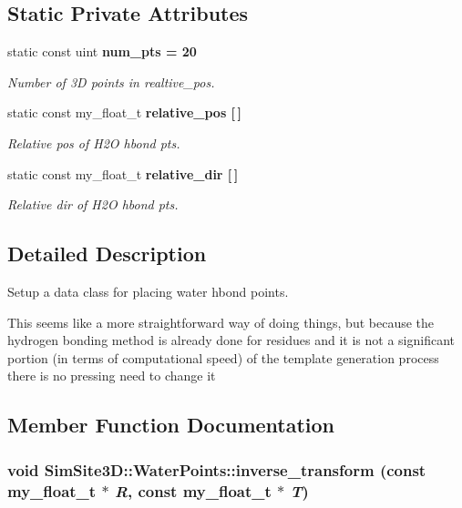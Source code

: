 \subsection*{Static Private Attributes}
\begin{CompactItemize}
\item 
static const uint \bf{num\_\-pts} = 20\label{classSimSite3D_1_1WaterPoints_a96d16672c2be18eb651e9594045a30d}

\begin{CompactList}\small\item\em Number of 3D points in realtive\_\-pos. \item\end{CompactList}\item 
static const my\_\-float\_\-t \bf{relative\_\-pos} [$\,$]
\begin{CompactList}\small\item\em Relative pos of H2O hbond pts. \item\end{CompactList}\item 
static const my\_\-float\_\-t \bf{relative\_\-dir} [$\,$]
\begin{CompactList}\small\item\em Relative dir of H2O hbond pts. \item\end{CompactList}\end{CompactItemize}


\subsection{Detailed Description}
Setup a data class for placing water hbond points. 

This seems like a more straightforward way of doing things, but because the hydrogen bonding method is already done for residues and it is not a significant portion (in terms of computational speed) of the template generation process there is no pressing need to change it 



\subsection{Member Function Documentation}
\subsubsection{\setlength{\rightskip}{0pt plus 5cm}void SimSite3D::Water\-Points::inverse\_\-transform (const my\_\-float\_\-t $\ast$ {\em R}, const my\_\-float\_\-t $\ast$ {\em T})\hspace{0.3cm}{\tt  [inline]}}\label{classSimSite3D_1_1WaterPoints_af926b1ccfc8db7ae215209d006e338b}



